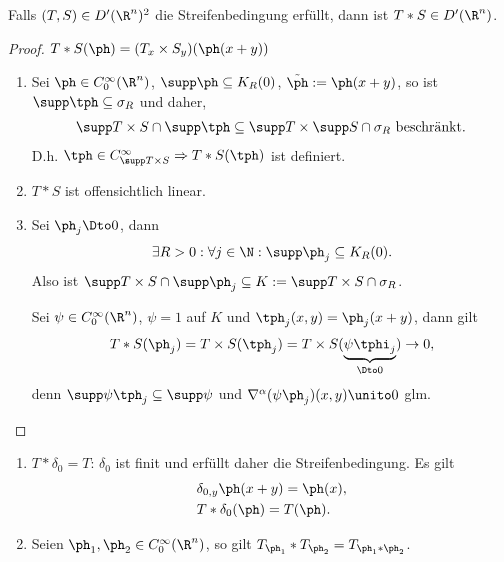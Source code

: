 \begin{prop}
\label{prop:3.38}
Falls $(T,S)\in D'(\R^n)^2$ die Streifenbedingung erfüllt, dann ist $T*S\in
D'(\R^n)$.\fishhere
\end{prop}
\begin{proof}
$T*S(\ph) = (T_x\times S_y)(\ph(x+y))$
\begin{enumerate}[label=\arabic{*}.)]
  \item Sei $\ph\in C_0^\infty(\R^n)$, $\supp\ph\subseteq K_R(0)$,
  $\tilde{\ph}:= \ph(x+y)$, so ist $\supp\tph \subseteq \sigma_R$ und daher,
\begin{align*}
\supp T\times S\cap \supp\tph \subseteq \supp T\times\supp S \cap \sigma_R
\text{ beschränkt}.
\end{align*}
D.h. $\tph\in C_{\supp T\times S}^\infty\Rightarrow T*S(\tph)$ ist definiert.
\item $T*S$ ist offensichtlich linear.
\item Sei $\ph_j\Dto 0$, dann
\begin{align*}
\exists R > 0: \forall j\in\N : \supp \ph_j \subseteq K_R(0).
\end{align*}
Also ist $\supp T\times S\cap \supp\ph_j\subseteq K:=\supp T\times S\cap
\sigma_R$.

Sei $\psi\in C_0^\infty(\R^n)$, $\psi=1$ auf $K$ und $\tph_j(x,y) =
\ph_j(x+y)$, dann gilt
\begin{align*}
T*S(\ph_j) = T\times S(\tph_j) = T\times S(\underbrace{\psi\tphi_j}_{\Dto 0})
\to 0,
\end{align*}
denn $\supp\psi\tph_j\subseteq \supp\psi$ und $\nabla^\alpha (\psi\ph_j)
(x,y)\unito 0$ glm.\qedhere
\end{enumerate}
\end{proof}

\begin{bsp}
\label{bsp:3.39}
\begin{enumerate}[label=\arabic{*}.)]
  \item $T*\delta_0 = T$: $\delta_0$ ist finit und erfüllt daher die
  Streifenbedingung. Es gilt
\begin{align*}
&\delta_{0,y} \ph(x+y) = \ph(x),\\
&T*\delta_{0}(\ph) = T(\ph).
\end{align*}
\item Seien $\ph_1,\ph_2\in C_0^\infty(\R^n)$, so gilt $T_{\ph_1}* T_{\ph_2} =
T_{\ph_1*\ph_2}$.\bsphere
\end{enumerate}
\end{bsp}

